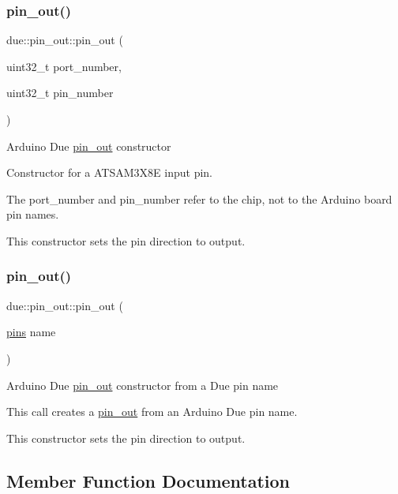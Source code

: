 \subsubsection{\texorpdfstring{pin\+\_\+out()}{pin\_out()}\hspace{0.1cm}{\footnotesize\ttfamily [1/2]}}
{\footnotesize\ttfamily due\+::pin\+\_\+out\+::pin\+\_\+out (\begin{DoxyParamCaption}\item[{uint32\+\_\+t}]{port\+\_\+number,  }\item[{uint32\+\_\+t}]{pin\+\_\+number }\end{DoxyParamCaption})\hspace{0.3cm}{\ttfamily [inline]}}

Arduino Due \hyperlink{classdue_1_1pin__out}{pin\+\_\+out} constructor

Constructor for a A\+T\+S\+A\+M3\+X8E input pin.

The port\+\_\+number and pin\+\_\+number refer to the chip, not to the Arduino board pin names.

This constructor sets the pin direction to output. \mbox{\label{classdue_1_1pin__out_ad0ede1c3e5e7501ae0dd045d83578c6c}} 
\subsubsection{\texorpdfstring{pin\+\_\+out()}{pin\_out()}\hspace{0.1cm}{\footnotesize\ttfamily [2/2]}}
{\footnotesize\ttfamily due\+::pin\+\_\+out\+::pin\+\_\+out (\begin{DoxyParamCaption}\item[{\hyperlink{namespacedue_a8ffa3ec309934ff9db34317e504bcc92}{pins}}]{name }\end{DoxyParamCaption})\hspace{0.3cm}{\ttfamily [inline]}}

Arduino Due \hyperlink{classdue_1_1pin__out}{pin\+\_\+out} constructor from a Due pin name

This call creates a \hyperlink{classdue_1_1pin__out}{pin\+\_\+out} from an Arduino Due pin name.

This constructor sets the pin direction to output. 

\subsection{Member Function Documentation}
\mbox{\label{classdue_1_1pin__out_a3db1935f691af312853dc2ebe06a56fb}} 
